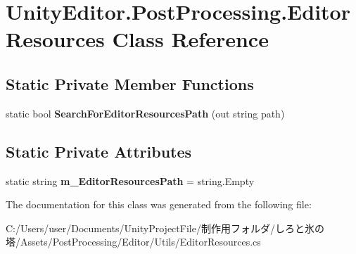 \hypertarget{class_unity_editor_1_1_post_processing_1_1_editor_resources}{}\section{Unity\+Editor.\+Post\+Processing.\+Editor\+Resources Class Reference}
\label{class_unity_editor_1_1_post_processing_1_1_editor_resources}
\subsection*{Static Private Member Functions}
\begin{DoxyCompactItemize}
\item 
\mbox{\label{class_unity_editor_1_1_post_processing_1_1_editor_resources_aff4f544fa0a0adb9195930978d51730e}} 
static bool {\bfseries Search\+For\+Editor\+Resources\+Path} (out string path)
\end{DoxyCompactItemize}
\subsection*{Static Private Attributes}
\begin{DoxyCompactItemize}
\item 
\mbox{\label{class_unity_editor_1_1_post_processing_1_1_editor_resources_a7fda5ef867d2761166c9d26564e57d3a}} 
static string {\bfseries m\+\_\+\+Editor\+Resources\+Path} = string.\+Empty
\end{DoxyCompactItemize}


The documentation for this class was generated from the following file\+:\begin{DoxyCompactItemize}
\item 
C\+:/\+Users/user/\+Documents/\+Unity\+Project\+File/制作用フォルダ/しろと氷の塔/\+Assets/\+Post\+Processing/\+Editor/\+Utils/Editor\+Resources.\+cs\end{DoxyCompactItemize}
